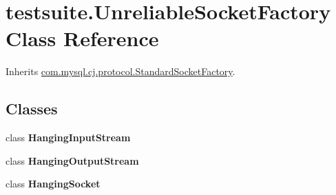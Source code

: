 \hypertarget{classtestsuite_1_1_unreliable_socket_factory}{}\section{testsuite.\+Unreliable\+Socket\+Factory Class Reference}
\label{classtestsuite_1_1_unreliable_socket_factory}


Inherits \mbox{\hyperlink{classcom_1_1mysql_1_1cj_1_1protocol_1_1_standard_socket_factory}{com.\+mysql.\+cj.\+protocol.\+Standard\+Socket\+Factory}}.

\subsection*{Classes}
\begin{DoxyCompactItemize}
\item 
class {\bfseries Hanging\+Input\+Stream}
\item 
class {\bfseries Hanging\+Output\+Stream}
\item 
class {\bfseries Hanging\+Socket}
\end{DoxyCompactItemize}
